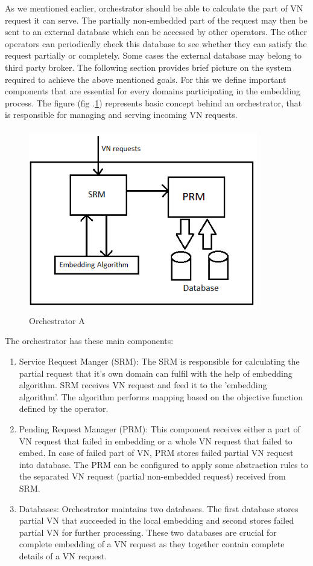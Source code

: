 \documentclass[article,dr=phil,type=msc ,colorback,accentcolor=tud4b]{tudthesis}
\begin{document}
As we mentioned earlier, orchestrator should be able to calculate the part of VN request it can serve. The partially non-embedded part of the request may then be sent to an external database which can be accessed by other operators. The other operators can periodically check this database to see whether they can satisfy the request partially or completely. Some cases the external database may belong to third party broker. The following section provides brief picture on the system required to achieve the above mentioned goals. For this we define important components that are essential for every domains participating in the embedding process. The figure (fig .\ref{orch}) represents basic concept behind an orchestrator, that is responsible for managing and serving incoming VN requests. \newline

\begin{figure}[h]
	\centering
	\includegraphics[width=10cm, height=8cm]{orch.jpg}
	\caption{Orchestrator A}
	\label{orch}
\end{figure}

The orchestrator has these main components:

\begin{enumerate}
\item  Service Request Manger (SRM): The SRM is responsible for calculating the partial request that it's own domain can fulfil with the help of embedding algorithm. SRM receives VN request and feed it to the 'embedding algorithm'. The algorithm performs mapping based on the objective function defined by the operator.
	
\item Pending Request Manager (PRM): This component receives either a part of VN request that failed in embedding or a whole VN request that failed to embed. In case of failed part of VN, PRM stores failed partial VN request into database. The PRM can be configured to apply some abstraction rules to the separated VN request (partial non-embedded request) received from SRM. 

\item Databases: Orchestrator maintains two databases. The first database stores partial VN that succeeded in the local embedding and second stores failed partial VN for further processing. These two databases are crucial for complete embedding of a VN request as they together contain complete details of a VN request.	
\end{enumerate}
 
\end{document}
